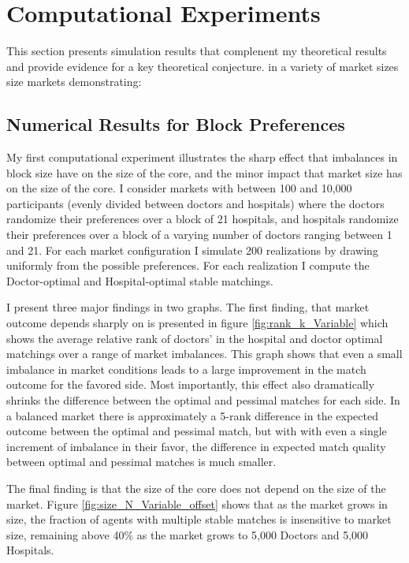 \documentclass[WP]{AEA}
\begin{document}
\section{Computational Experiments}
This section presents simulation results that complenent my theoretical results and provide evidence for a key theoretical conjecture.
in a variety of market sizes size markets demonstrating:

\subsection{Numerical Results for Block Preferences}
My first computational experiment illustrates the sharp effect that imbalances in block size have on the size of the core, and the minor impact that market size has on the size of the core. I consider markets with between 100 and 10,000 participants (evenly divided between doctors and hospitals) where the doctors randomize their preferences over a block of 21 hospitals, and hospitals randomize their preferences over a block of a varying number of doctors ranging between 1 and 21.  For each market configuration I simulate 200 realizations by drawing uniformly from the possible preferences.  For each realization I compute the Doctor-optimal and Hospital-optimal stable matchings.  

I present three major findings in two graphs.  The first finding, that market outcome depends sharply on  is presented in figure 
\ref{fig:rank_k_Variable} 
which shows the average relative rank of doctors' in the hospital and doctor optimal matchings over a range of market imbalances.  This graph shows that even a small imbalance in market conditions leads to a large improvement in the match outcome for the favored side.  Most importantly, this effect also dramatically shrinks the difference between the optimal and pessimal matches for each side.  In a balanced market there is approximately a 5-rank difference in the expected outcome between the optimal and pessimal match, but with with even a single increment of imbalance in their favor, the difference in expected match quality between optimal and pessimal matches is much smaller. 

The final finding is that the size of the core does not depend on the size of the market.  Figure 
\ref{fig:size_N_Variable_offset} 
shows that as the market grows in size, the fraction of agents with multiple stable matches is insensitive to market size, remaining above 40\% as the market grows to 5,000 Doctors and 5,000 Hospitals.  
\end{document}
